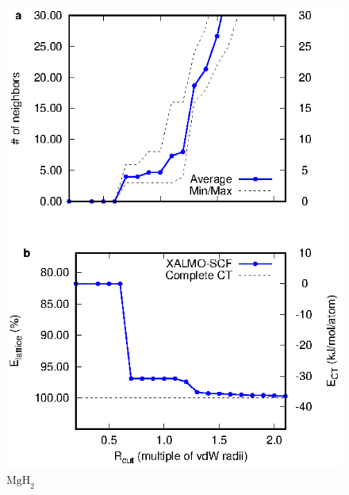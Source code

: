 \documentclass[aps,prb,twocolumn,amsmath,amssymb,superscriptaddress,longbibliography]{revtex4-1}
\begin{document}
\begin{figure}
\includegraphics[scale=1]{plots/MgH2_EvRneutral}
\caption{$\text{MgH}_{2}$}
\label{mgh2n}
\end{figure}
\end{document}
